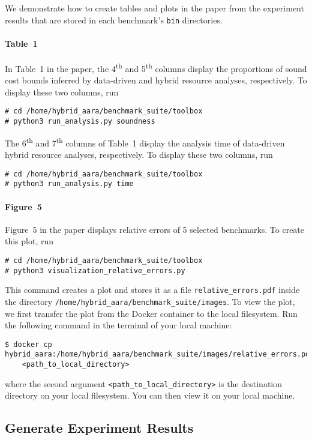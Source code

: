 We demonstrate how to create tables and plots in the paper from the experiment
results that are stored in each benchmark's \texttt{bin} directories.

\paragraph{Table~1}

In Table~1 in the paper, the 4\textsuperscript{th} and 5\textsuperscript{th}
columns display the proportions of sound cost bounds inferred by data-driven and
hybrid resource analyses, respectively.
%
To display these two columns, run
\begin{verbatim}
# cd /home/hybrid_aara/benchmark_suite/toolbox
# python3 run_analysis.py soundness
\end{verbatim}

The 6\textsuperscript{th} and 7\textsuperscript{th} columns of Table~1 display
the analysis time of data-driven hybrid resource analyses, respectively.
To display these two columns, run
\begin{verbatim}
# cd /home/hybrid_aara/benchmark_suite/toolbox
# python3 run_analysis.py time
\end{verbatim}

\paragraph{Figure~5}

Figure~5 in the paper displays relative errors of 5 selected benchmarks.
%
To create this plot, run
\begin{verbatim}
# cd /home/hybrid_aara/benchmark_suite/toolbox
# python3 visualization_relative_errors.py
\end{verbatim}
%
This command creates a plot and stores it as a file
\texttt{relative\_errors.pdf} inside the directory
\texttt{/home/hybrid\_aara/benchmark\_suite/images}.
%
To view the plot, we first transfer the plot from the Docker container to the
local filesystem.
%
Run the following command in the terminal of your local machine:
\begin{verbatim}
$ docker cp hybrid_aara:/home/hybrid_aara/benchmark_suite/images/relative_errors.pdf 
    <path_to_local_directory>
\end{verbatim}
where the second argument \texttt{<path\_to\_local\_directory>} is the
destination directory on your local filesystem.
%
You can then view it on your local machine.

\subsection{Generate Experiment Results}
\label{sec:generate experiment results}

